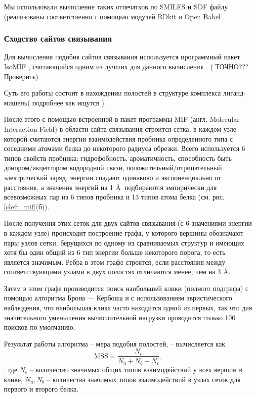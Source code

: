 \documentclass[a4paper,14pt]{article}         %
\begin{document}
Мы использовали вычисление таких отпечатков по SMILES и SDF файлу (реализованы соответственно с помощью модулей RDkit \cite{rdkit} и Open Babel \cite{openbabel}.

\subsubsection{Сходство сайтов связывания}
Для вычисления подобия сайтов связывания используется программный пакет IsoMIF \cite{isomif, Chartier2015}, считающийся одним из лучших для данного вычисления \cite{Ehrt2016}. (\color{orange} ТОЧНО??? Проверить\color{black})

Суть его работы состоит в нахождении полостей в структуре комплекса лиганд-мишень\cite{Gaudreault2015, Laskowski1995}(\color{orange} подробнее как ищутся \color{black}). 

После этого с помощью встроенной в пакет программы MIF (англ. Molecular Interaction Field) в области сайта связывания строится сетка, в каждом узле которой считаются энергии взаимодействия пробника определенного типа с соседними атомами белка до некоторого радиуса обрезки. Всего используется 6 типов свойств пробника: гидрофобность, ароматичность, способность быть донором/акцептором водородной связи, положительный/отрицательный электрический заряд, энергии спадают одинаково и экспоненциально от расстояния, а значения энергий на 1 \AA $\:$ подбираются эмпирически для всевозможных пар из 6 типов пробника и 13 типов атома белка (см. рис. \ref{cleft_mif}(б)).

После получения этих сеток для двух сайтов связывания (с 6 значениями энергии в каждом узле) происходит построение графа, у которого вершины обозначают пары узлов сетки, берущихся по одному из сравниваемых структур и имеющих хотя бы один общий из 6 тип энергии больше некоторого порога, то есть является значимым. Ребра в этом графе строятся, если расстояния между соответствующими узлами в двух полостях отличаются менее, чем на 3 \AA. 

Затем в этом графе производится поиск наибольшей клики (полного подграфа) с помощью алгоритма Брона — Кербоша \cite{Bron1973, Tomita2006} и с использованием эвристического наблюдения, что наибольшая клика часто находится одной из первых, так что для значительного уменьшения вычислительной нагрузки проводится только 100 поисков по умолчанию. 

Результат работы алгоритма -- мера подобия полостей, -- вычисляется как
\begin{equation}
\text{MSS} = \frac{N_c}{N_a + N_b - N_c},
\end{equation} \cite{Chartier2015}.
где $N_c$ -- количество значимых общих типов взаимодействий у всех вершин в клике, $N_a, N_b$ -- количества значимых типов взаимодействий в узлах сеток для первого и второго белка. 
\end{document}
